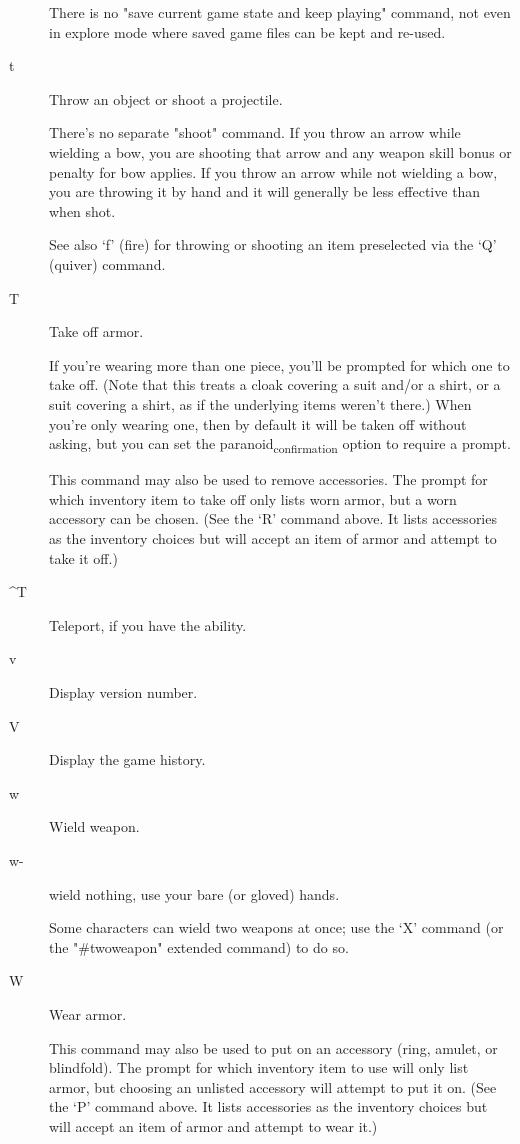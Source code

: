 \documentclass[11pt]{article}
\begin{document}
\begin{description}
There is no "save current game state and keep playing" command, not
 even in explore mode where saved game files can be kept and
 re-used.

\item[{t}] Throw an object or shoot a projectile.

There's no separate "shoot" command. If you throw an arrow while
 wielding a bow, you are shooting that arrow and any weapon skill
 bonus or penalty for bow applies. If you throw an arrow while not
 wielding a bow, you are throwing it by hand and it will generally be
 less effective than when shot. 

See also `f' (fire) for throwing or shooting an item preselected via
 the `Q' (quiver) command.

\item[{T}] Take off armor.

If you're wearing more than one piece, you'll be prompted for which
 one to take off. (Note that this treats a cloak covering a suit
 and/or a shirt, or a suit covering a shirt, as if the underlying
 items weren't there.) When you're only wearing one, then by default
 it will be taken off without asking, but you can set the
 paranoid\textsubscript{confirmation} option to require a prompt. 

This command may also be used to remove accessories.  The prompt for
 which inventory item to take off only lists worn armor, but a worn
 accessory can be chosen.  (See the `R' command above. It lists
 accessories as the inventory choices but will accept an item of
 armor and attempt to take it off.)

\item[{\^{}T}] Teleport, if you have the ability.

\item[{v}] Display version number.

\item[{V}] Display the game history.

\item[{w}] Wield weapon.

\item[{w-}] wield nothing, use your bare (or gloved) hands.

Some characters can wield two weapons at once; use the `X' command
 (or the "\#twoweapon" extended command) to do so.

\item[{W}] Wear armor.

This command may also be used to put on an accessory (ring,
 amulet, or blindfold). The prompt for which inventory item to use
 will only list armor, but choosing an unlisted accessory will
 attempt to put it on. (See the `P' command above. It lists
 accessories as the inventory choices but will accept an item of
 armor and attempt to wear it.)


\end{description}
\end{document}
